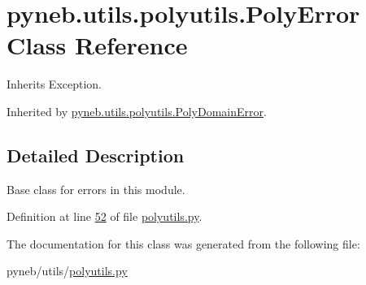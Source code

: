 \hypertarget{classpyneb_1_1utils_1_1polyutils_1_1_poly_error}{\section{pyneb.\-utils.\-polyutils.\-Poly\-Error Class Reference}
\label{classpyneb_1_1utils_1_1polyutils_1_1_poly_error}
}


Inherits Exception.



Inherited by \hyperlink{classpyneb_1_1utils_1_1polyutils_1_1_poly_domain_error}{pyneb.\-utils.\-polyutils.\-Poly\-Domain\-Error}.



\subsection{Detailed Description}
\begin{DoxyVerb}Base class for errors in this module.\end{DoxyVerb}
 

Definition at line \hyperlink{polyutils_8py_source_l00052}{52} of file \hyperlink{polyutils_8py_source}{polyutils.\-py}.



The documentation for this class was generated from the following file\-:\begin{DoxyCompactItemize}
\item 
pyneb/utils/\hyperlink{polyutils_8py}{polyutils.\-py}\end{DoxyCompactItemize}
